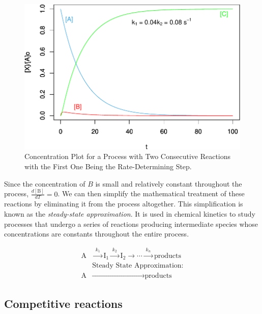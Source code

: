\documentclass[
  9pt,
]{extbook}
\theoremstyle{definition}
\theoremstyle{definition}
\theoremstyle{definition}
\theoremstyle{remark}
\begin{document}
\begin{figure}

{\centering \includegraphics{pchem1_files/figure-latex/figk6-1} 

}

\caption{Concentration Plot for a Process with Two Consecutive Reactions with the First One Being the Rate-Determining Step.}\label{fig:figk6}
\end{figure}

Since the concentration of \(B\) is small and relatively constant throughout the process, \(\frac{d[\mathrm{B}]}{dT}=0\). We can then simplify the mathematical treatment of these reactions by eliminating it from the process altogether. This simplification is known as the \emph{steady-state approximation}. It is used in chemical kinetics to study processes that undergo a series of reactions producing intermediate species whose concentrations are constants throughout the entire process.

\begin{equation}
\begin{aligned}
\text{A} &\xrightarrow{\;k_1\;} \text{I}_1 \xrightarrow{\;k_2\;} \text{I}_2 \xrightarrow{\quad} \cdots \xrightarrow{\;k_n\;}\text{products} \\
& \text{Steady State Approximation:} \\
\text{A}&\xrightarrow{\qquad\qquad\qquad\qquad\quad\quad\;\;}\text{products}
\end{aligned}
\label{eq:kincomp8}
\end{equation}

\hypertarget{competitive-reactions}{%
\subsection{Competitive reactions}\label{competitive-reactions}}
\end{document}
